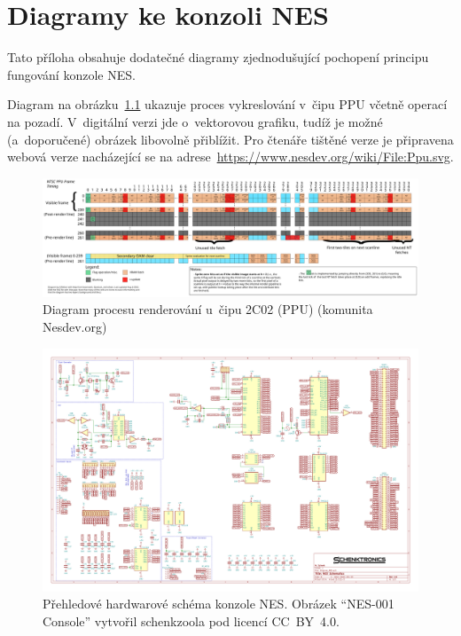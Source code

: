 \chapter{Diagramy ke konzoli NES}
\label{apx:ppu}

Tato příloha obsahuje dodatečné diagramy zjednodušující pochopení principu fungování konzole NES.

Diagram na obrázku~\ref{ppu:renderovani} ukazuje proces vykreslování v~čipu PPU včetně operací na pozadí. V~digitální verzi jde o~vektorovou grafiku, tudíž je možné (a~doporučené) obrázek libovolně přiblížit. Pro čtenáře tištěné verze je připravena webová verze nacházející se na adrese~\url{https://www.nesdev.org/wiki/File:Ppu.svg}.

\begin{figure}[p]
	\centering
	\caption{Diagram procesu renderování u~čipu 2C02 (PPU) (komunita Nesdev.org)}
	\label{ppu:renderovani}
	\includegraphics[width=1\textheight, angle=270]{images/ppudiag.pdf}
\end{figure}

\begin{figure}[p]
	\centering
	\caption{Přehledové hardwarové schéma konzole NES. Obrázek \enquote{NES-001 Console} vytvořil schenkzoola pod licencí CC~BY~4.0.}
	\label{fig:nes001-hw}
	\includegraphics[width=0.95\textheight, angle=270]{images/NES-001.pdf}
\end{figure}

